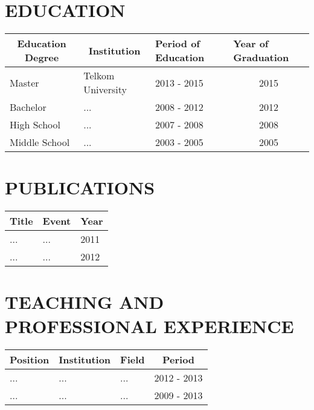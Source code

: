 \section*{EDUCATION}
\begin{table}[H]
	\begin{tabular}{|l|l|p{2cm}|p{2.3cm}|}
		\hline
		\multicolumn{1}{|c|}{{\bf Education Degree}} & \multicolumn{1}{c|}{{\bf Institution}} & {\bf Period of Education} & {\bf Year of Graduation} \\ \hline
		Master  & Telkom University & 2013 - 2015 & \multicolumn{1}{c|}{2015}  \\ \hline
		Bachelor & ... & 2008 - 2012 & \multicolumn{1}{c|}{2012} \\ \hline
		High School & ... & 2007 - 2008 & \multicolumn{1}{c|}{2008} \\ \hline
		Middle School & ... & 2003 - 2005 & \multicolumn{1}{c|}{2005} \\ \hline
	\end{tabular}
\end{table}

\section*{PUBLICATIONS}
\begin{table}[H]
	\begin{tabular}{|p{6cm}|p{6cm}|p{1cm}|}
		\hline
		\multicolumn{1}{|c|}{{\bf Title}} & \multicolumn{1}{c|}{{\bf Event}} & \multicolumn{1}{c|}{{\bf Year}} \\ \hline
		... & ... & 2011\\ \hline
		... & ... & 2012\\ \hline
	\end{tabular}
\end{table}


\section*{TEACHING AND PROFESSIONAL EXPERIENCE}
\begin{table}[H]
	\begin{tabular}{|p{2cm}|p{4.5cm}|p{4.2cm}|c|}
		\hline
		\multicolumn{1}{|c|}{{\bf Position}} & \multicolumn{1}{c|}{{\bf Institution}} & \multicolumn{1}{c|}{{\bf Field}} & {\bf Period} \\ \hline
		... & ... & ... & 2012 - 2013\\ \hline
		... & ... & ... & 2009 - 2013 \\ \hline
	\end{tabular}
\end{table}

